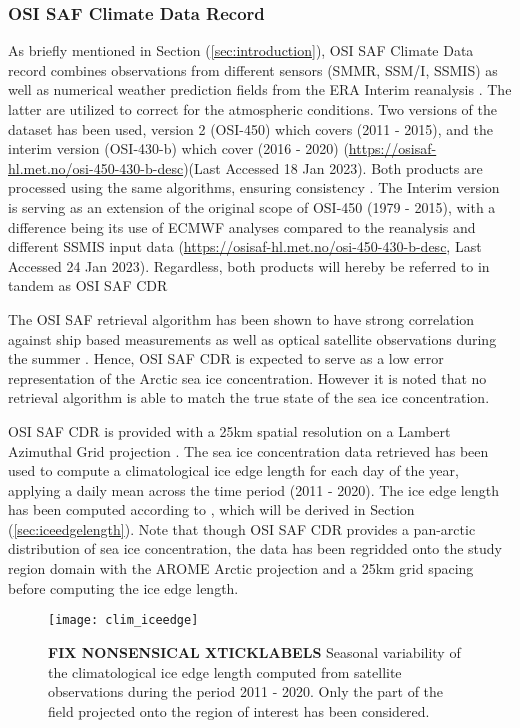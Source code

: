 \documentclass[../main/thesis.tex]{subfiles}
\begin{document}
\subsubsection{OSI SAF Climate Data Record}
\label{sec:osisafcdr}
As briefly mentioned in Section (\ref{sec:introduction}), OSI SAF Climate Data record combines observations from different sensors (SMMR, SSM/I, SSMIS) as well as numerical weather prediction fields from the ERA Interim reanalysis \citep{Dee2011}. The latter are utilized to correct for the atmospheric conditions. Two versions of the dataset has been used, version 2 (OSI-450) which covers (2011 - 2015), and the interim version (OSI-430-b) which cover (2016 - 2020) (\url{https://osisaf-hl.met.no/osi-450-430-b-desc})(Last Accessed 18 Jan 2023). Both products are processed using the same algorithms, ensuring consistency \citep{Lavergne2019a}. The Interim version is serving as an extension of the original scope of OSI-450 (1979 - 2015), with a difference being its use of ECMWF analyses compared to the reanalysis and different SSMIS input data (\url{https://osisaf-hl.met.no/osi-450-430-b-desc}, Last Accessed 24 Jan 2023). Regardless, both products will hereby be referred to in tandem as OSI SAF CDR

The OSI SAF retrieval algorithm has been shown to have strong correlation against ship based measurements \citep{Kern2019} as well as optical satellite observations during the summer \citep{Kern2020}. Hence, OSI SAF CDR is expected to serve as a low error representation of the Arctic sea ice concentration. However it is noted that no retrieval algorithm is able to match the true state of the sea ice concentration.

OSI SAF CDR is provided with a 25km spatial resolution on a Lambert Azimuthal Grid projection \citep{Soerensen2021}. The sea ice concentration data retrieved has been used to compute a climatological ice edge length for each day of the year, applying a daily mean across the time period (2011 - 2020). The ice edge length has been computed according to \citet{Melsom2019}, which will be derived in Section (\ref{sec:iceedgelength}). Note that though OSI SAF CDR provides a pan-arctic distribution of sea ice concentration, the data has been regridded onto the study region domain with the  AROME Arctic projection and a 25km grid spacing before computing the ice edge length.

\begin{figure}
    \centering
    \texttt{[image: clim\_iceedge]}
    \caption{\label{fig:clim_iceedge} \textbf{FIX NONSENSICAL XTICKLABELS} Seasonal variability of the climatological ice edge length computed from satellite observations during the period 2011 - 2020. Only the part of the field projected onto the region of interest has been considered.}
\end{figure}
\end{document}
